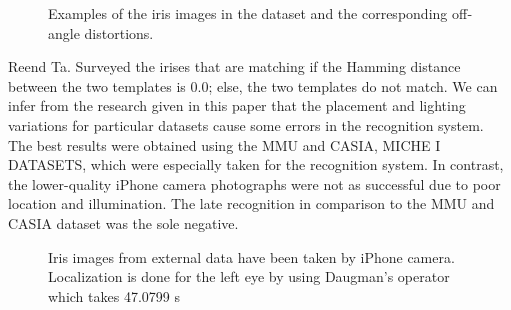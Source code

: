\documentclass[9pt,twocolumn,twoside]{osajnl}
\begin{document}
\begin{figure}[htbp]
\centering
{}
\caption{Examples of the iris images in the dataset and the corresponding off‐angle distortions.}
\label{fig:Examples of Distortions}
\end{figure}

Reend Ta. \cite{sam:5} Surveyed the irises that are matching if the Hamming distance between the two templates is 0.0; else, the two templates do not match. We can infer from the research given in this paper that the placement and lighting variations for particular datasets cause some errors in the recognition system. The best results were obtained using the MMU and CASIA, MICHE I DATASETS, which were especially taken for the recognition system. In contrast, the lower-quality iPhone camera photographs were not as successful due to poor location and illumination. The late recognition in comparison to the MMU and CASIA dataset was the sole negative.

\begin{figure}[htbp]
\centering
{}
\caption{Iris images from external data have been taken by iPhone camera. Localization is done for the left eye by using Daugman's operator which takes 47.0799 s}
\label{fig:I-Phone}
\end{figure}
\end{document}
